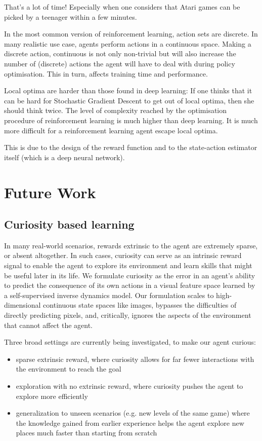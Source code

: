 \documentclass[conference]{IEEEtran}
\begin{document}
That’s a lot of time! Especially when one considers that Atari games can be picked by a teenager within a few minutes.

In the most common version of reinforcement learning, action sets are discrete. In many realistic use case, agents perform actions in a continuous space. Making a discrete action, continuous is not only non-trivial but will also increase the number of (discrete) actions the agent will have to deal with during policy optimisation. This in turn, affects training time and performance.

Local optima are harder than those found in deep learning: If one thinks that it can be hard for Stochastic Gradient Descent to get out of local optima, then she should think twice. The level of complexity reached by the optimisation procedure of reinforcement learning is much higher than deep learning. It is much more difficult for a reinforcement learning agent escape local optima.

This is due to the design of the reward function and to the state-action estimator itself (which is a deep neural network).

\section{Future Work}

\subsection{\textbf{Curiosity based learning}}

In many real-world scenarios, rewards extrinsic to the agent are extremely sparse, or absent altogether. In such cases, curiosity can serve as an intrinsic reward signal to enable the agent to explore its environment and learn skills that might be useful later in its life. We formulate curiosity as the error in an agent's ability to predict the consequence of its own actions in a visual feature space learned by a self-supervised inverse dynamics model. Our formulation scales to high-dimensional continuous state spaces like images, bypasses the difficulties of directly predicting pixels, and, critically, ignores the aspects of the environment that cannot affect the agent.

Three broad settings are currently being investigated, to make our agent curious:

\begin{itemize}
\item sparse extrinsic reward, where curiosity allows for far fewer interactions with the environment to reach the goal
\item exploration with no extrinsic reward, where curiosity pushes the agent to explore more efficiently
\item generalization to unseen scenarios (e.g. new levels of the same game) where the knowledge gained from earlier experience helps the agent explore new places much faster than starting from scratch
\end{itemize}
\end{document}
